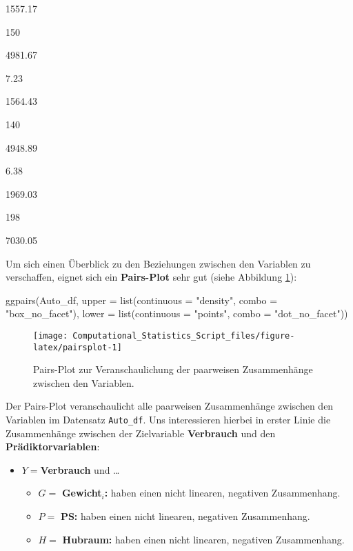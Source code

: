 \documentclass[
  ngerman,
]{book}
\newenvironment{Shaded}{\begin{snugshade}}{\end{snugshade}}
\newcommand{\AttributeTok}[1]{\textcolor[rgb]{0.77,0.63,0.00}{#1}}
\newcommand{\FunctionTok}[1]{\textcolor[rgb]{0.00,0.00,0.00}{#1}}
\newcommand{\NormalTok}[1]{#1}
\newcommand{\StringTok}[1]{\textcolor[rgb]{0.31,0.60,0.02}{#1}}
\providecommand{\tightlist}{%
  \setlength{\itemsep}{0pt}\setlength{\parskip}{0pt}}
\begin{document}
1557.17

150

4981.67

7.23

1564.43

140

4948.89

6.38

1969.03

198

7030.05

Um sich einen Überblick zu den Beziehungen zwischen den Variablen zu verschaffen, eignet sich ein \textbf{Pairs-Plot} sehr gut (siehe Abbildung \ref{fig:pairsplot}):

\begin{Shaded}
\begin{Highlighting}[]
\FunctionTok{ggpairs}\NormalTok{(Auto\_df,}
\AttributeTok{upper =} \FunctionTok{list}\NormalTok{(}\AttributeTok{continuous =} \StringTok{"density"}\NormalTok{, }\AttributeTok{combo =} \StringTok{"box\_no\_facet"}\NormalTok{),}
\AttributeTok{lower =} \FunctionTok{list}\NormalTok{(}\AttributeTok{continuous =} \StringTok{"points"}\NormalTok{, }\AttributeTok{combo =} \StringTok{"dot\_no\_facet"}\NormalTok{))}
\end{Highlighting}
\end{Shaded}

\begin{figure}[h]

{\centering \texttt{[image: Computational\_Statistics\_Script\_files/figure-latex/pairsplot-1]} 

}

\caption{Pairs-Plot zur Veranschaulichung der paarweisen Zusammenhänge zwischen den Variablen.}\label{fig:pairsplot}
\end{figure}

Der Pairs-Plot veranschaulicht alle paarweisen Zusammenhänge zwischen den Variablen im Datensatz \texttt{Auto\_df}. Uns interessieren hierbei in erster Linie die Zusammenhänge zwischen der Zielvariable \textbf{Verbrauch} und den \textbf{Prädiktorvariablen}:

\begin{itemize}
\tightlist
\item
  \(Y=\)\textbf{Verbrauch} und \ldots{}

  \begin{itemize}
  \tightlist
  \item
    \(G=\) \textbf{Gewicht}\(_i\)\textbf{:} haben einen nicht linearen, negativen Zusammenhang.
  \item
    \(P=\) \textbf{PS:} haben einen nicht linearen, negativen Zusammenhang.
  \item
    \(H=\) \textbf{Hubraum:} haben einen nicht linearen, negativen Zusammenhang.
  \end{itemize}
\end{itemize}
\end{document}

